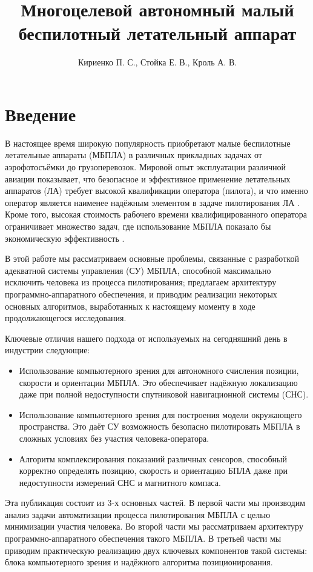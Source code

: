\documentclass[11pt,a4paper]{article}
\title{Многоцелевой автономный малый беспилотный летательный аппарат}
\author{Кириенко П. С., Стойка Е. В., Кроль А. В.}
\affil{Zubax Robotics, г. Москва}
\date{}
\begin{document}
\maketitle

\section{Введение}

В настоящее время широкую популярность приобретают малые беспилотные летательные аппараты (МБПЛА) в различных прикладных задачах от аэрофотосъёмки до грузоперевозок. Мировой опыт эксплуатации различной авиации показывает, что безопасное и эффективное применение летательных аппаратов (ЛА) требует высокой квалификации оператора (пилота), и что именно оператор является наименее надёжным элементом в задаче пилотирования ЛА \cite{RiskManagementHandbookFAA, PlaneCrashInfo, HumanFactorsBoeing}. Кроме того, высокая стоимость рабочего времени квалифицированного оператора ограничивает множество задач, где использование МБПЛА показало бы экономическую эффективность \cite{DroneHire}.

В этой работе мы рассматриваем основные проблемы, связанные с разработкой адекватной системы управления (СУ) МБПЛА, способной максимально исключить человека из процесса пилотирования; предлагаем архитектуру программно-аппаратного обеспечения, и приводим реализации некоторых основных алгоритмов, выработанных к настоящему моменту в ходе продолжающегося исследования.

Ключевые отличия нашего подхода от используемых на сегодняшний день в индустрии следующие:

\begin{itemize}
    \item Использование компьютерного зрения для автономного счисления позиции, скорости и ориентации МБПЛА. Это обеспечивает надёжную локализацию даже при полной недоступности спутниковой навигационной системы (СНС).
    \item Использование компьютерного зрения для построения модели окружающего пространства. Это даёт СУ возможность безопасно пилотировать МБПЛА в сложных условиях без участия человека-оператора.
    \item Алгоритм комплексирования показаний различных сенсоров, способный корректно определять позицию, скорость и ориентацию БПЛА даже при недоступности измерений СНС и магнитного компаса.
\end{itemize}

Эта публикация состоит из 3-х основных частей. В первой части мы производим анализ задачи автоматизации процесса пилотирования МБПЛА с целью минимизации участия человека. Во второй части мы рассматриваем архитектуру программно-аппаратного обеспечения такого МБПЛА. В третьей части мы приводим практическую реализацию двух ключевых компонентов такой системы: блока компьютерного зрения и надёжного алгоритма позиционирования.
\end{document}
